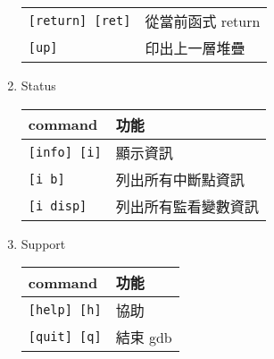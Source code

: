 \begin{enumerate}
\begin{tabular}[c]{|p{2.28cm}|p{2.68cm}|}
        \verb|[return] [ret]|           & 從當前函式 return \\
        \verb|[up]|                     & 印出上一層堆疊 \\
        \hline
    \end{tabular}
    \item Status \par
    \begin{tabular}[c]{|p{2.28cm}|p{2.68cm}|}
        \hline
        command                         & 功能 \\
        \hline
        \verb|[info] [i]|               & 顯示資訊 \\
        \verb|[i b]|                    & 列出所有中斷點資訊 \\
        \verb|[i disp]|                 & 列出所有監看變數資訊 \\
        \hline
    \end{tabular}
    \item Support \par
    \begin{tabular}[c]{|p{2.28cm}|p{2.68cm}|}
        \hline
        command                         & 功能 \\
        \hline
        \verb|[help] [h]|               & 協助 \\
        \verb|[quit] [q]|               & 結束 gdb \\
        \hline
    \end{tabular}
\end{enumerate}